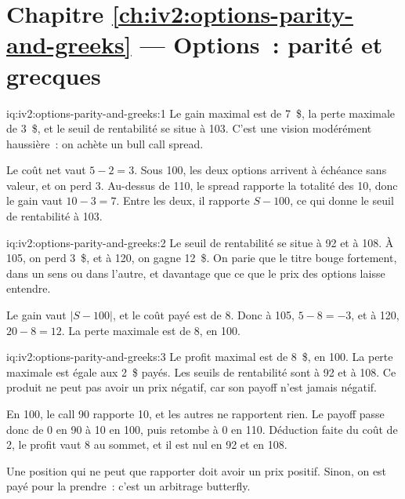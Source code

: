 \section*{Chapitre \ref{ch:iv2:options-parity-and-greeks} --- Options~: parité et grecques}

\begin{solution}{iq:iv2:options-parity-and-greeks:1}
Le gain maximal est de 7~\$, la perte maximale de 3~\$, et le seuil de rentabilité se situe à 103. C'est une vision modérément haussière~: on achète un bull call spread.

Le coût net vaut $5 - 2 = 3$. Sous 100, les deux options arrivent à échéance sans valeur, et on perd 3. Au-dessus de 110, le spread rapporte la totalité des 10, donc le gain vaut $10 - 3 = 7$. Entre les deux, il rapporte $S - 100$, ce qui donne le seuil de rentabilité à 103.

\end{solution}

\begin{solution}{iq:iv2:options-parity-and-greeks:2}
Le seuil de rentabilité se situe à 92 et à 108. À 105, on perd 3~\$, et à 120, on gagne 12~\$. On parie que le titre bouge fortement, dans un sens ou dans l'autre, et davantage que ce que le prix des options laisse entendre.

Le gain vaut $|S - 100|$, et le coût payé est de 8. Donc à 105, $5 - 8 = -3$, et à 120, $20 - 8 = 12$. La perte maximale est de 8, en 100.

\end{solution}

\begin{solution}{iq:iv2:options-parity-and-greeks:3}
Le profit maximal est de 8~\$, en 100. La perte maximale est égale aux 2~\$ payés. Les seuils de rentabilité sont à 92 et à 108. Ce produit ne peut pas avoir un prix négatif, car son payoff n'est jamais négatif.

En 100, le call 90 rapporte 10, et les autres ne rapportent rien. Le payoff passe donc de 0 en 90 à 10 en 100, puis retombe à 0 en 110. Déduction faite du coût de 2, le profit vaut 8 au sommet, et il est nul en 92 et en 108.

Une position qui ne peut que rapporter doit avoir un prix positif. Sinon, on est payé pour la prendre~: c'est un arbitrage butterfly.

\end{solution}

